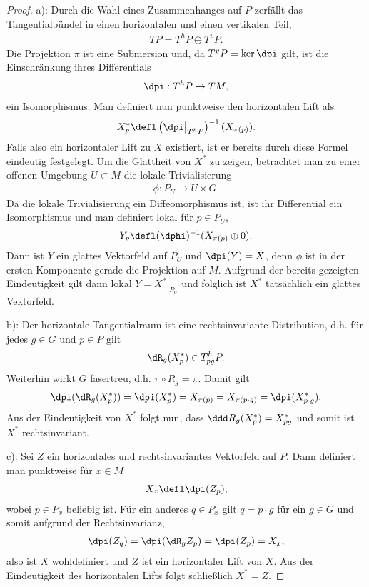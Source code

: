 \documentclass[%
	paper=a5,%
	fleqn,%
	DIV=18,%
	BCOR=0mm,
	fontsize=11pt,
	titlepage=false,%
	bibliography=totoc,
	DIV=18,%
	twoside=true,
	pdftitle=Riemannsche Geometrie,
	pdfauthor=Uwe Semmelmann,
	numbers=noendperiod]%
	{scrbook}
\begin{document}
\begin{proof}
a): Durch die Wahl eines Zusammenhanges auf $P$ zerfällt das Tangentialbündel in
einen horizontalen und einen vertikalen Teil,
\begin{align*}
TP = T^hP \oplus T^vP.
\end{align*}
Die Projektion $\pi$ ist eine Submersion und, da $T^vP = \ker \dpi$ gilt, ist
die Einschränkung ihres Differentials
\begin{align*}
\dpi: T^hP \to TM,
\end{align*}
ein Isomorphismus. Man definiert nun punktweise den horizontalen Lift als
\begin{align*}
X^*_p \defl \left(\dpi\big|_{T^hP}\right)^{-1}(X_{\pi(p)}).
\end{align*}
Falls also ein horizontaler Lift zu $X$ existiert, ist er bereits durch
diese Formel eindeutig festgelegt. Um die Glattheit von $X^*$ zu zeigen,
betrachtet man zu einer offenen Umgebung $U\subset M$ die lokale
Trivialisierung
\begin{align*}
\phi: P_U\to U\times G.
\end{align*}
Da die lokale Trivialisierung ein Diffeomorphismus ist, ist ihr Differential ein
Isomorphismus und man definiert lokal für $p\in P_U$,
\begin{align*}
Y_p \defl (\dphi)^{-1}(X_{\pi(p)}\oplus 0).
\end{align*}
Dann ist $Y$ ein glattes Vektorfeld auf $P_U$ und $\dpi(Y) = X$, denn $\phi$ ist
in der ersten Komponente gerade die Projektion auf $M$. Aufgrund der bereits
gezeigten Eindeutigkeit gilt dann lokal $Y = X^*\big|_{P_U}$ und folglich ist
$X^*$ tatsächlich ein glattes Vektorfeld.

b): Der horizontale Tangentialraum ist eine rechtsinvariante Distribution, d.h.
für jedes $g\in G$ und $p\in P$ gilt
\begin{align*}
\dR_g (X^*_p) \in T_{pg}^h P.
\end{align*}
Weiterhin wirkt $G$ fasertreu, d.h. $\pi\circ R_g = \pi$. Damit gilt
\begin{align*}
\dpi( \dR_g (X_p^*)) = \dpi(X_p^*) = X_{\pi(p)} = X_{\pi(p\cdot g)} = \dpi(X^*_{p\cdot g}).
\end{align*}
Aus der Eindeutigkeit von $X^*$ folgt nun, dass $\ddd R_g(X^*_p) = X_{pg}^*$
und somit ist $X^*$ rechtsinvariant.

c): Sei $Z$ ein horizontales und rechtsinvariantes Vektorfeld auf $P$. Dann
definiert man punktweise für $x\in M$
\begin{align*}
X_x \defl \dpi(Z_p),
\end{align*}
wobei $p\in P_x$ beliebig ist. Für ein anderes $q\in P_x$ gilt $q = p\cdot g$
für ein $g\in G$ und somit aufgrund der Rechtsinvarianz,
\begin{align*}
\dpi(Z_q) = \dpi(\dR_g Z_p) = \dpi(Z_p) = X_x,
\end{align*}
also ist $X$ wohldefiniert und $Z$ ist ein horizontaler Lift von $X$. Aus der Eindeutigkeit des horizontalen Lifts
folgt schließlich $X^* = Z$.


\end{proof}
\end{document}
